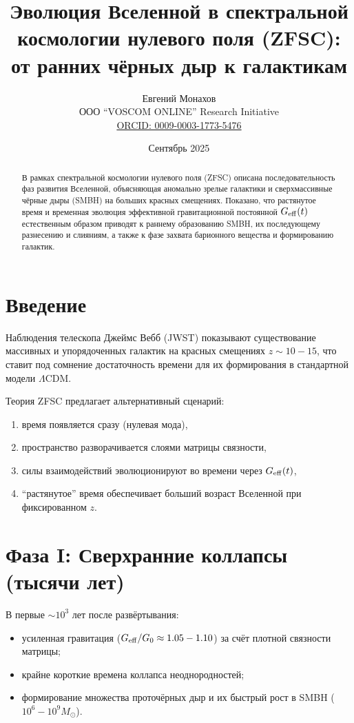 \documentclass[12pt,a4paper]{article}
\title{Эволюция Вселенной в спектральной космологии нулевого поля (ZFSC): \\
от ранних чёрных дыр к галактикам}
\author{Евгений Монахов \\ ООО ``VOSCOM ONLINE'' Research Initiative \\ 
\href{https://orcid.org/0009-0003-1773-5476}{ORCID: 0009-0003-1773-5476}}
\date{Сентябрь 2025}
\begin{document}
\maketitle

\begin{abstract}
В рамках спектральной космологии нулевого поля (ZFSC) описана последовательность фаз развития Вселенной, объясняющая аномально зрелые галактики и сверхмассивные чёрные дыры (SMBH) на больших красных смещениях. Показано, что растянутое время и временная эволюция эффективной гравитационной постоянной $G_{\rm eff}(t)$ естественным образом приводят к раннему образованию SMBH, их последующему разнесению и слияниям, а также к фазе захвата барионного вещества и формированию галактик. 
\end{abstract}

\section{Введение}
Наблюдения телескопа Джеймс Вебб (JWST) показывают существование массивных и упорядоченных галактик на красных смещениях $z\sim 10-15$, что ставит под сомнение достаточность времени для их формирования в стандартной модели $\Lambda$CDM.

Теория ZFSC предлагает альтернативный сценарий:
\begin{enumerate}
  \item время появляется сразу (нулевая мода),
  \item пространство разворачивается слоями матрицы связности,
  \item силы взаимодействий эволюционируют во времени через $G_{\rm eff}(t)$,
  \item ``растянутое'' время обеспечивает больший возраст Вселенной при фиксированном $z$.
\end{enumerate}

\section{Фаза I: Сверхранние коллапсы (тысячи лет)}
В первые $\sim 10^3$ лет после развёртывания:
\begin{itemize}
  \item усиленная гравитация ($G_{\rm eff}/G_0 \approx 1.05-1.10$) за счёт плотной связности матрицы;
  \item крайне короткие времена коллапса неоднородностей;
  \item формирование множества проточёрных дыр и их быстрый рост в SMBH ($10^6-10^9 M_\odot$).
\end{itemize}
\end{document}
